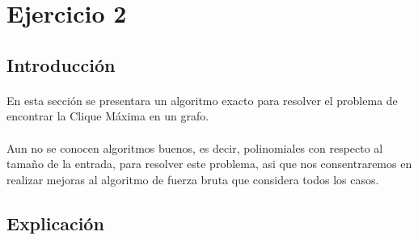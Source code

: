 \section{Ejercicio 2}

\subsection{Introducción}

\paragraph{}
En esta sección se presentara un algoritmo exacto para resolver el problema de encontrar la Clique Máxima en un grafo.


\paragraph{}
Aun no se conocen algoritmos buenos, es decir, polinomiales con respecto al tamaño de la entrada, para resolver este problema, asi que nos consentraremos en 
realizar mejoras al algoritmo de fuerza bruta que considera todos los casos.



\subsection{Explicación}



\paragraph{}

